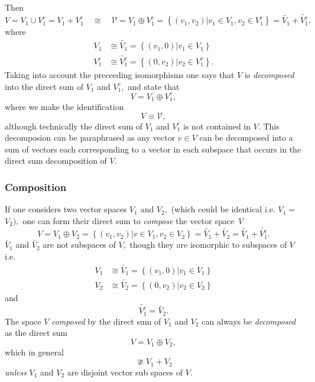 \documentclass[aps,preprint]{revtex4}
\begin{document}
Then 
\begin{equation}
V=V_{1}\cup V_{1}^{c}=V_{1}+V_{1}^{c}\quad\cong\quad\mathcal{V}=V_{1}\oplus
V_{1}^{c}=\left\{ \left. \left( v_{1},v_{2}\right) \right\vert v_{1}\in
V_{1},v_{2}\in V_{1}^{c}\right\} =\widetilde{V_{1}}+\widetilde{V_{1}^{c}},
\end{equation}
where 
\begin{align}
V_{1} & \cong\widetilde{V_{1}}=\left\{ \left. \left( v_{1},0\right)
\right\vert v_{1}\in V_{1}\right\} \\
V_{1}^{c} & \cong\widetilde{V_{1}^{c}}=\left\{ \left. \left( 0,v_{2}\right)
\right\vert v_{2}\in V_{1}^{c}\right\} .
\end{align}
Taking into account the preceeding isomorphisms one says that $V$ is \emph{%
decomposed} into the direct sum of $V_{1}$ and $V_{1}^{c},$ and state that 
\begin{equation}
V=V_{1}\oplus V_{1}^{c},
\end{equation}
where we make the identification 
\begin{equation}
V\equiv\mathcal{V},
\end{equation}
although technically the direct sum of $V_{1}$ and $V_{1}^{c}$ is not
contained in $V.$ This decomposion can be paraphrased as any vector $v\in V$
can be decomposed into a sum of vectors each corresponding to a vector in
each subspace that occurs in the direct sum decomposition of $V.$

\subsubsection{Composition}

If one considers two vector spaces $V_{1}$ and $V_{2},$ (which could be
identical i.e. $V_{1}=$ $V_{2}),$ one can form their direct sum to \emph{%
compose }the vector space\emph{\ }$V$ 
\begin{equation}
V=V_{1}\oplus V_{2}=\left\{ \left. \left( v_{1},v_{2}\right) \right\vert
v\in V_{1},v_{2}\in V_{2}\right\} =\widetilde{V_{1}}+\widetilde{V_{2}}=%
\widetilde{V_{1}}+\widetilde{V_{1}^{c}}.
\end{equation}
$\widetilde{V_{1}}$ and $\widetilde{V_{2}}$ are not subspaces of $V,$ though
they are isomorphic to subspaces of $V$ i.e. 
\begin{align}
V_{1} & \cong\widetilde{V_{1}}=\left\{ \left. \left( v_{1},0\right)
\right\vert v_{1}\in V_{1}\right\} \\
V_{2} & \cong\widetilde{V_{2}}=\left\{ \left. \left( 0,v_{2}\right)
\right\vert v_{2}\in V_{2}\right\}
\end{align}
and 
\begin{equation}
\widetilde{V_{1}^{c}}=\widetilde{V_{2}}.
\end{equation}
The space $V$ \emph{composed} by the direct sum of $V_{1}$ and $V_{2}$ can
always be \emph{decomposed} as the direct sum 
\begin{equation}
V=V_{1}\oplus V_{2},
\end{equation}
which in general 
\begin{equation}
\ncong V_{1}+V_{2}
\end{equation}
\emph{unless} $V_{1}$ and $V_{2}$ are disjoint vector sub spaces of $V$.
\end{document}
